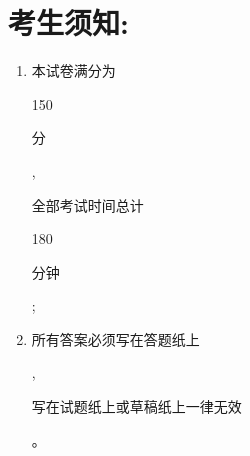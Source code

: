 \documentclass[10pt]{article}
\begin{document}
\section{考生须知:}
\begin{enumerate}
  \item \begin{CJK}{UTF8}{mj}本试卷满分为\end{CJK} 150 \begin{CJK}{UTF8}{mj}分\end{CJK}, \begin{CJK}{UTF8}{mj}全部考试时间总计\end{CJK} 180 \begin{CJK}{UTF8}{mj}分钟\end{CJK};

  \item \begin{CJK}{UTF8}{mj}所有答案必须写在答题纸上\end{CJK}, \begin{CJK}{UTF8}{mj}写在试题纸上或草稿纸上一律无效\end{CJK}。

\end{enumerate}
\end{document}
